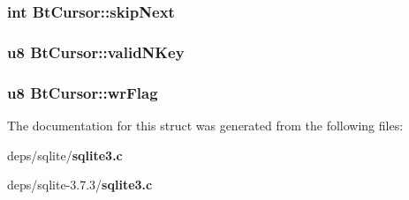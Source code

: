 \subsubsection{\setlength{\rightskip}{0pt plus 5cm}int \bf{Bt\-Cursor::skip\-Next}}\label{structBtCursor_38def78efc38319242569f47e9ebbc2f}


\subsubsection{\setlength{\rightskip}{0pt plus 5cm}\bf{u8} \bf{Bt\-Cursor::valid\-NKey}}\label{structBtCursor_4db32c3416d221108fcda1bb45dc19b3}


\subsubsection{\setlength{\rightskip}{0pt plus 5cm}\bf{u8} \bf{Bt\-Cursor::wr\-Flag}}\label{structBtCursor_3032e3ebb86a8ba97c0e8a58cafe0d90}




The documentation for this struct was generated from the following files:\begin{CompactItemize}
\item 
deps/sqlite/\bf{sqlite3.c}\item 
deps/sqlite-3.7.3/\bf{sqlite3.c}\end{CompactItemize}
